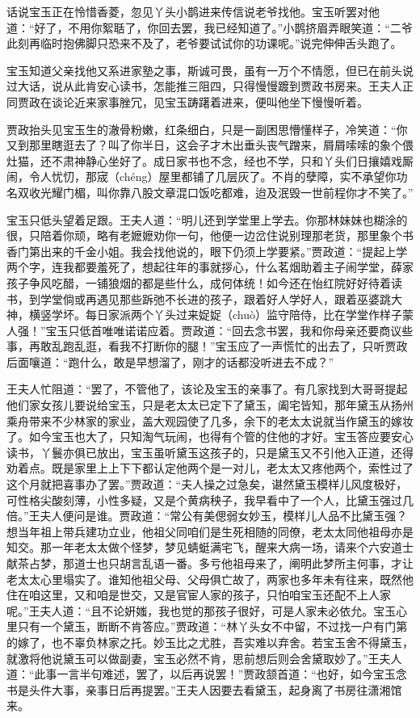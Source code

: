 \documentclass[12pt,oneside]{book}
\begin{document}
话说宝玉正在怜惜香菱，忽见丫头小鹊进来传信说老爷找他。宝玉听罢对他道：“好了，不用你絮聒了，你回去罢，我已经知道了。”小鹊挤眉弄眼笑道：“二爷此刻再临时抱佛脚只恐来不及了，老爷要试试你的功课呢。”说完伸伸舌头跑了。

宝玉知道父亲找他又系进家塾之事，斯诚可畏，虽有一万个不情愿，但已在前头说过大话，说从此肯安心读书，怎能推三阻四，只得慢慢踱到贾政书房来。王夫人正同贾政在谈论近来家事脞冗，见宝玉踌躇着进来，便叫他坐下慢慢听着。

贾政抬头见宝玉生的澈骨粉嫩，红条细白，只是一副困思懵懂样子，冷笑道：“你又到那里瞎逛去了？叫了你半日，这会子才木出垂头丧气蹭来，屑屑嗦嗦的象个偎灶猫，还不肃神静心坐好了。成日家书也不念，经也不学，只和丫头们日攘嬉戏厮闹，令人忧忉，那宬（chéng）屋里都铺了几层灰了。不肖的孽障，实不承望你功名双收光耀门楣，叫你靠八股文章混口饭吃都难，迨及泯毁一世前程你才不笑了。”

宝玉只低头望着足跟。王夫人道：“明儿还到学堂里上学去。你那林妹妹也糊涂的很，只陪着你顽，略有老嬷嬷劝你一句，他便一边岔住说别理那老货，那里象个书香门第出来的千金小姐。我会找他说的，眼下仍须上学要紧。”贾政道：“提起上学两个字，连我都要羞死了，想起往年的事就拶心，什么茗烟助着主子闹学堂，薛家孩子争风吃醋，一铺狼烟的都是些什么，成何体统！如今还在怡红院好好待着读书，到学堂倘或再遇见那些跅弛不长进的孩子，跟着好人学好人，跟着巫婆跳大神，横竖学坏。每日家派两个丫头过来娖娖（chuò）监守陪侍，比在学堂作样子蒙人强！”宝玉只低首唯唯诺诺应着。贾政道：“回去念书罢，我和你母亲还要商议些事，再敢乱跑乱逛，看我不打断你的腿！”宝玉应了一声慌忙的出去了，只听贾政后面嚷道：“跑什么，敢是早想溜了，刚才的话都没听进去不成？”

王夫人忙阻道：“罢了，不管他了，该论及宝玉的亲事了。有几家找到大哥哥提起他们家女孩儿要说给宝玉，只是老太太已定下了黛玉，阖宅皆知，那年黛玉从扬州乘舟带来不少林家的家业，盖大观园使了几多，余下的老太太说就当作黛玉的嫁妆了。如今宝玉也大了，只知淘气玩闹，也得有个管的住他的才好。宝玉答应要安心读书，丫鬟亦俱已放出，宝玉虽听黛玉这孩子的，只是黛玉又不引他入正道，还得劝着点。既是家里上上下下都认定他两个是一对儿，老太太又疼他两个，索性过了这个月就把喜事办了罢。”贾政道：“夫人操之过急矣，谌然黛玉模样儿风度极好，可性格尖酸刻薄，小性多疑，又是个黄病秧子，我早看中了一个人，比黛玉强过几倍。”王夫人便问是谁。贾政道：“常公有美偲弱女妙玉，模样儿人品不比黛玉强？想当年祖上带兵建功立业，他祖父同咱们是生死相随的同僚，老太太同他祖母亦是知交。那一年老太太做个怪梦，梦见蜻蜓满宅飞，醒来大病一场，请来个六安道士献茶占梦，那道士也只胡言乱语一番。多亏他祖母来了，阐明此梦所主何事，才让老太太心里塌实了。谁知他祖父母、父母俱亡故了，两家也多年未有往来，既然他住在咱这里，又和咱是世交，又是官宦人家的孩子，只怕咱宝玉还配不上人家呢。”王夫人道：“且不论姸媸，我也觉的那孩子很好，可是人家未必依允。宝玉心里只有一个黛玉，断断不肯答应。”贾政道：“林丫头女不中留，不过找一户有门第的嫁了，也不辜负林家之托。妙玉比之尤胜，吾实难以弃舍。若宝玉舍不得黛玉，就激将他说黛玉可以做副妻，宝玉必然不肯，思前想后则会舍黛取妙了。”王夫人道：“此事一言半句难述，罢了，以后再说罢！”贾政颔首道：“也好，如今宝玉念书是头件大事，亲事日后再提罢。”王夫人因要去看黛玉，起身离了书房往潇湘馆来。
\end{document}
